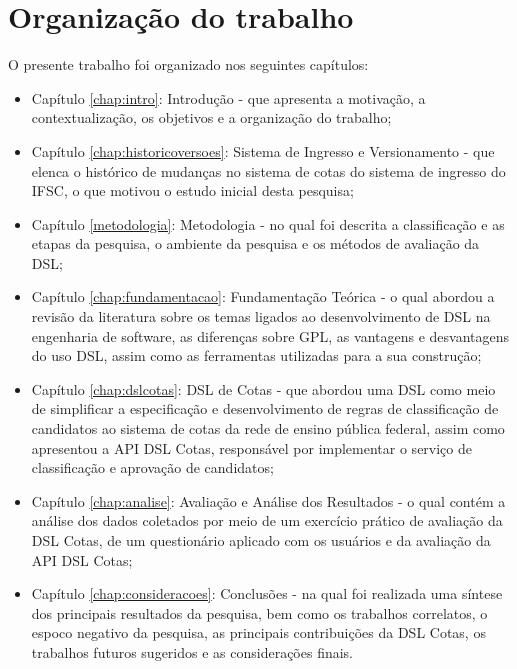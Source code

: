 \section{Organização do trabalho}
\label{organizacao}

O presente trabalho foi organizado nos seguintes capítulos:

\begin{itemize}
    \item Capítulo \ref{chap:intro}: Introdução - que apresenta a motivação, a contextualização, os objetivos e a organização do trabalho;
    \item Capítulo \ref{chap:historicoversoes}: Sistema de Ingresso e Versionamento - que elenca o histórico de mudanças no sistema de cotas do sistema de ingresso do \gls{IFSC}, o que motivou o estudo inicial desta pesquisa;
    \item Capítulo \ref{metodologia}: Metodologia - no qual foi descrita a classificação e as etapas da pesquisa, o ambiente da pesquisa e os métodos de avaliação da DSL;
    \item Capítulo \ref{chap:fundamentacao}: Fundamentação Teórica - o qual abordou a revisão da literatura sobre os temas ligados ao desenvolvimento de \gls{DSL} na engenharia de software, as diferenças sobre \gls{GPL}, as vantagens e desvantagens do uso  \gls{DSL}, assim como as ferramentas utilizadas para a sua construção;
    \item Capítulo \ref{chap:dslcotas}: DSL de Cotas - que abordou uma \gls{DSL} como meio de simplificar a especificação e desenvolvimento de regras de classificação de candidatos ao sistema de cotas da rede de ensino pública federal, assim como apresentou a \gls{API} DSL Cotas, responsável por implementar o serviço de classificação e aprovação de candidatos;
    \item Capítulo \ref{chap:analise}: Avaliação e Análise dos Resultados - o qual contém a análise dos dados coletados por meio de um exercício prático de avaliação da DSL Cotas, de um questionário aplicado com os usuários e da avaliação da
    \gls{API} DSL Cotas;
    \item Capítulo \ref{chap:consideracoes}: Conclusões - na qual foi realizada uma síntese dos principais resultados da pesquisa, bem como os trabalhos correlatos, o espoco negativo da pesquisa, as principais contribuições da DSL Cotas, os trabalhos futuros sugeridos e as considerações finais.
\end{itemize}
